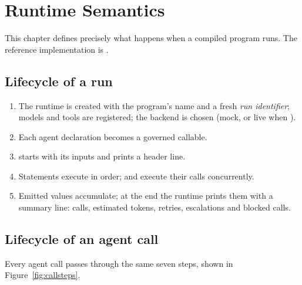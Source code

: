 \chapter{Runtime Semantics}
\label{ch:runtime}

This chapter defines precisely what happens when a compiled program runs. The reference implementation is .

\section{Lifecycle of a run}

\begin{enumerate}
  \item The runtime is created with the program's name and a fresh \emph{run identifier}; models and tools are registered; the backend is chosen (mock, or live when ).
  \item Each agent declaration becomes a governed callable.
  \item {} starts with its inputs and prints a header line.
  \item Statements execute in order;  and  execute their calls concurrently.
  \item Emitted values accumulate; at the end the runtime prints them with a summary line: calls, estimated tokens, retries, escalations and blocked calls.
\end{enumerate}

\section{Lifecycle of an agent call}
\label{sec:callsteps}

Every agent call passes through the same seven steps, shown in Figure~\ref{fig:callsteps}.

